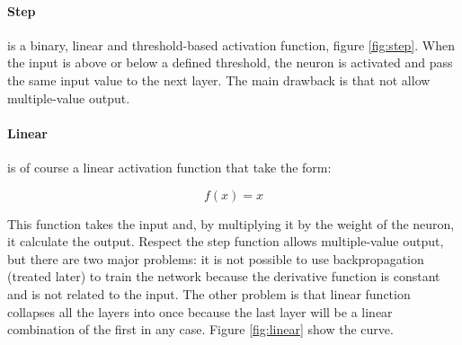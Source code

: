 \documentclass[%
    corpo=12pt,
    twoside,
    oldstyle,
    autoretitolo,
    greek,
    evenboxes,
]{toptesi}
\begin{document}
\paragraph{Step} is a binary, linear and threshold-based activation function, figure \ref{fig:step}. When the input is above or below a defined threshold, the neuron is activated and pass the same input value to the next layer. The main drawback is that not allow multiple-value output.

\paragraph{Linear} is of course a linear activation function that take the form:
\begin{center}
  \begin{equation}
    f(x) = x
  \end{equation}
\end{center}
This function takes the input and, by multiplying it by the weight of the neuron, it calculate the output. Respect the step function allows multiple-value output, but there are two major problems: it is not possible to use backpropagation (treated later) to train the network because the derivative function is constant and is not related to the input. The other problem is that linear function collapses all the layers into once because the last layer will be a linear combination of the first in any case. Figure \ref{fig:linear} show the curve.
\end{document}
